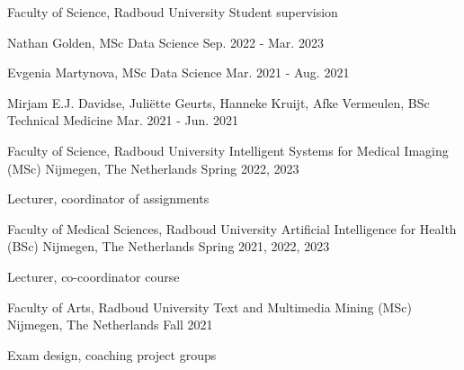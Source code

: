 

\begin{cventries}

  \cventry
    {Faculty of Science, Radboud University} %
    {Student supervision} %
    {} %
    {} %
    {
      \begin{cvitems} %
        \item {Nathan Golden, MSc Data Science\hspace*{\fill} Sep. 2022 - Mar. 2023}
        \item {Evgenia Martynova, MSc Data Science\hspace*{\fill} Mar. 2021 - Aug. 2021}
        \item {Mirjam E.J. Davidse, Juliëtte Geurts, Hanneke Kruijt, Afke Vermeulen, BSc Technical Medicine\hspace*{\fill} Mar. 2021 - Jun. 2021}
      \end{cvitems}
    }

  \cventry
    {Faculty of Science, Radboud University} %
    {Intelligent Systems for Medical Imaging (MSc)} %
    {Nijmegen, The Netherlands} %
    {Spring 2022, 2023} %
    {
      \begin{cvitems} %
        \item {Lecturer, coordinator of assignments}
      \end{cvitems}
    }

  \cventry
    {Faculty of Medical Sciences, Radboud University} %
    {Artificial Intelligence for Health (BSc)} %
    {Nijmegen, The Netherlands} %
    {Spring 2021, 2022, 2023} %
    {
      \begin{cvitems} %
        \item {Lecturer, co-coordinator course}
      \end{cvitems}
    }

  \cventry
    {Faculty of Arts, Radboud University} %
    {Text and Multimedia Mining (MSc)} %
    {Nijmegen, The Netherlands} %
    {Fall 2021} %
    {
      \begin{cvitems} %
        \item {Exam design, coaching project groups}
      \end{cvitems}
    }


\end{cventries}
